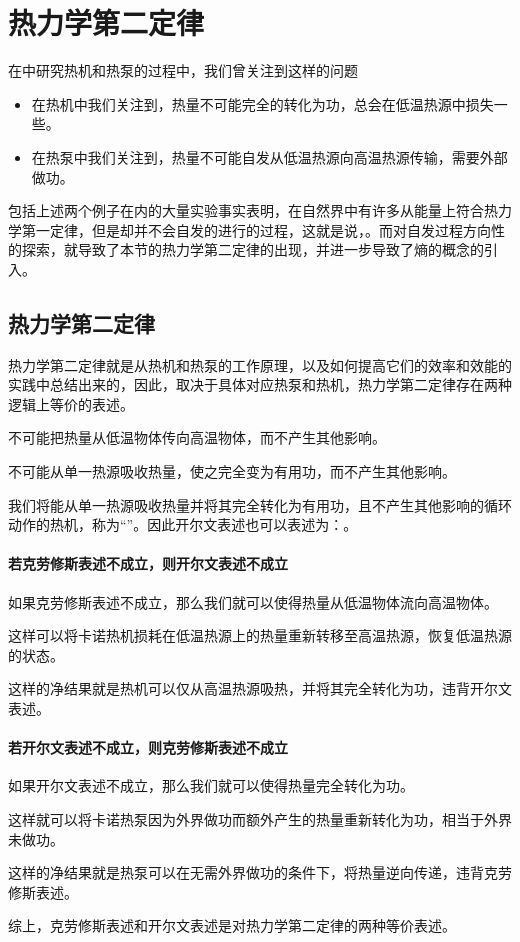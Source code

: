 \section{热力学第二定律}
在中研究热机和热泵的过程中，我们曾关注到这样的问题
\begin{itemize}
    \item 在热机中我们关注到，热量不可能完全的转化为功，总会在低温热源中损失一些。
    \item 在热泵中我们关注到，热量不可能自发从低温热源向高温热源传输，需要外部做功。
\end{itemize}
包括上述两个例子在内的大量实验事实表明，在自然界中有许多从能量上符合热力学第一定律，但是却并不会自发的进行的过程，这就是说，。而对自发过程方向性的探索，就导致了本节的热力学第二定律的出现，并进一步导致了熵的概念的引入。

\subsection{热力学第二定律}
热力学第二定律就是从热机和热泵的工作原理，以及如何提高它们的效率和效能的实践中总结出来的，因此，取决于具体对应热泵和热机，热力学第二定律存在两种逻辑上等价的表述。

\begin{BoxLaw}[热力学第二定律的克劳修斯表述]
    不可能把热量从低温物体传向高温物体，而不产生其他影响。
\end{BoxLaw}

\begin{BoxLaw}[热力学第二定律的开尔文表述]
    不可能从单一热源吸收热量，使之完全变为有用功，而不产生其他影响。
\end{BoxLaw}
我们将能从单一热源吸收热量并将其完全转化为有用功，且不产生其他影响的循环动作的热机，称为“”。因此开尔文表述也可以表述为：。
\begin{Proof}[克劳修斯表述和开尔文表述的等价性]
\paragraph{若克劳修斯表述不成立，则开尔文表述不成立}
如果克劳修斯表述不成立，那么我们就可以使得热量从低温物体流向高温物体。

这样可以将卡诺热机损耗在低温热源上的热量重新转移至高温热源，恢复低温热源的状态。

这样的净结果就是热机可以仅从高温热源吸热，并将其完全转化为功，违背开尔文表述。

\paragraph{若开尔文表述不成立，则克劳修斯表述不成立}
如果开尔文表述不成立，那么我们就可以使得热量完全转化为功。

这样就可以将卡诺热泵因为外界做功而额外产生的热量重新转化为功，相当于外界未做功。

这样的净结果就是热泵可以在无需外界做功的条件下，将热量逆向传递，违背克劳修斯表述。\vspace{1ex}

综上，克劳修斯表述和开尔文表述是对热力学第二定律的两种等价表述。
\end{Proof}

